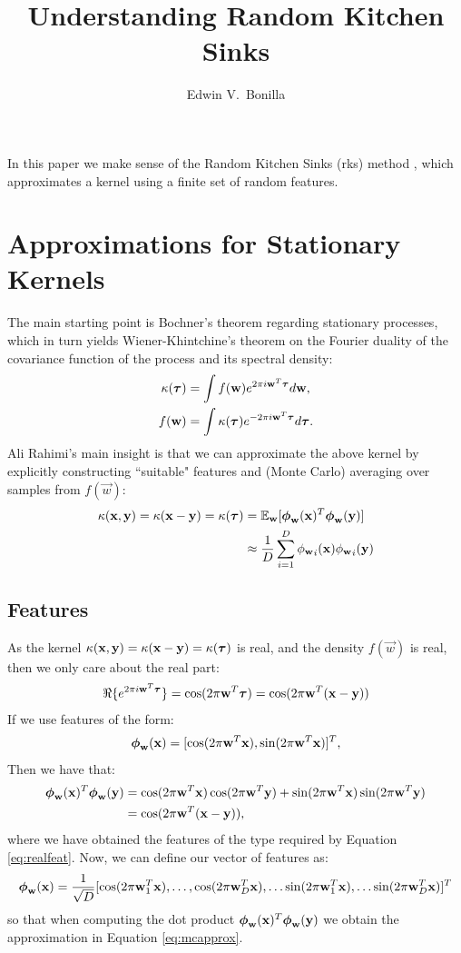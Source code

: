 \documentclass[11pt,a4paper]{article}
\title{Understanding Random Kitchen Sinks}
\author{Edwin V.~Bonilla}
\newcommand{\rks}{{\sc rks}}
\renewcommand{\t}{\vecS{\tau}}
\newcommand{\w}{\vec{w}}
\newcommand{\dw}{d\vec{w}}
\newcommand{\dt}{d\t}
\renewcommand{\t}{\vecS{\tau}}
\newcommand{\x}{\vec{x}}
\newcommand{\y}{\vec{y}}
\newcommand{\phiw}{\phi_{\w}}
\newcommand{\vphi}{\vecS{\phi}}
\newcommand{\vphiw}{\vphi_{\w}}
\begin{document}
\maketitle
In this paper we make sense of the Random Kitchen Sinks (\rks) method , which 
approximates a kernel using a finite set of random features.
%
\section{Approximations for Stationary Kernels}
The main starting point is Bochner's theorem regarding stationary processes, which in turn 
yields Wiener-Khintchine's theorem on the Fourier duality of the covariance function of the process
and its spectral density:
\begin{align}
	\kernel(\t) &= \int f(\w) e^{2 \pi i \w^T \t } \dw \text{,} \\
	\label{eq:ft}
			 f(\w) &= \int \kernel(\t) e^{- 2 \pi i \w^T \t } \dt \text{.}
\end{align}
Ali Rahimi's main insight is that we can approximate the above kernel by explicitly constructing 
``suitable" features and (Monte Carlo) averaging over samples from $f(\w)$: 
\begin{align}
	\kernel(\x, \y) = \kernel(\x-\y) = \kernel(\t) &= \expectation_{\w}[\vphiw(\x)^T \vphiw(\y)] \\
	\label{eq:mcapprox}
	& \approx \frac{1}{D} \sum_{i=1}^D {\phiw}_i(\x) {\phiw}_i(\y)
\end{align}
\subsection{Features}
As the kernel 
 $\kernel(\x,\y) = \kernel(\x-\y) = \kernel(\t)$ is  real, and the density $f(\w)$ is real, then we only care about 
 the real part:
\begin{align}
  \label{eq:realfeat}
   \Re\{e^{2 \pi i \w^T \t }\} = \cos(2 \pi  \w^T \t) = \cos(2 \pi \w^T(\x - \y))
\end{align} 
If we use features of the form: 
\begin{align}
	\vphiw(\x) = [\cos( 2 \pi \vec{w}^T  \x) , \sin( 2 \pi \vec{w}^T \x) ]^T \text{,}
\end{align}
Then we have that:
\begin{align}
	\vphiw(\x)^T \vphiw(\y) &=  \cos( 2 \pi \vec{w}^T  \x)  \cos( 2 \pi \vec{w}^T  \y) + \sin( 2 \pi \vec{w}^T \x) \sin( 2 \pi \vec{w}^T \y)\\
	& = \cos(2 \pi \w^T (\x - \y)) \text{,}
\end{align}
where we have obtained the features of the type required by Equation \eqref{eq:realfeat}. Now, 
we can define our vector of features as:
\begin{align}
	\vphiw(\x) = \frac{1}{\sqrt{D}} [ \cos(2 \pi \w_1^T \x), \ldots, \cos(2 \pi \w_D^T \x),
										\ldots \sin(2 \pi \w_1^T \x), \ldots \sin(2 \pi \w_D^T \x)]^T 
\end{align}
so that when computing the dot product $\vphiw(\x)^T \vphiw(\y)$ we obtain the approximation 
in Equation \eqref{eq:mcapprox}.
%
\end{document}

